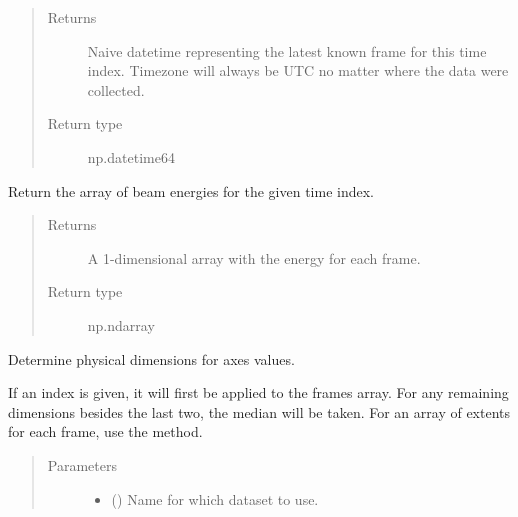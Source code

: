 \documentclass[letterpaper,10pt,english]{sphinxmanual}
\begin{document}
\begin{fulllineitems}
\begin{fulllineitems}
\begin{quote}
\begin{description}
\item[{Returns}] \leavevmode
{} \textendash{} Naive datetime representing the latest known frame for
this time index. Timezone will always be UTC no matter where
the data were collected.

\item[{Return type}] \leavevmode
np.datetime64

\end{description}\end{quote}

\end{fulllineitems}


\begin{fulllineitems}
\label{\detokenize{xanespy:xanespy.xanes_frameset.XanesFrameset.energies}}
Return the array of beam energies for the given time index.
\begin{quote}\begin{description}
\item[{Returns}] \leavevmode
{} \textendash{} A 1-dimensional array with the energy for each frame.

\item[{Return type}] \leavevmode
np.ndarray

\end{description}\end{quote}

\end{fulllineitems}


\begin{fulllineitems}
\label{\detokenize{xanespy:xanespy.xanes_frameset.XanesFrameset.extent}}
Determine physical dimensions for axes values.

If an index is given, it will first be applied to the frames
array. For any remaining dimensions besides the last two, the
median will be taken. For an array of extents for each frame,
use the  method.
\begin{quote}\begin{description}
\item[{Parameters}] \leavevmode\begin{itemize}
\item {} 
 (\sphinxstyleliteralemphasis{, }) \textendash{} Name for which dataset to use.


\end{itemize}
\end{description}
\end{quote}
\end{fulllineitems}
\end{fulllineitems}
\end{document}
